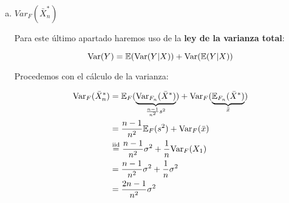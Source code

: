 \documentclass[a4paper]{article}
\begin{document}
\begin{enumerate}[a)]
	\item $Var_{F}(\bar X_n^*)$
	
	Para este último apartado haremos uso de la \textbf{ley de la varianza total}:
	
	\[
		\text{Var}(Y) = \mathbb{E}(\text{Var}(Y|X)) + \text{Var}(\mathbb{E}(Y|X))
	\]
	
	Procedemos con el cálculo de la varianza:
	
	\[
		\begin{split}
			\text{Var}_{F}(\bar X_n^*) & = \mathbb{E}_{F}( \underbrace{\text{Var}_{F_n}(\bar X^*)}_{\frac{n-1}{n^2} s^2} ) + \text{Var}_{F}( \underbrace{\mathbb{E}_{F_n}(\bar X^*)}_{\bar x} )\\
			& = \frac{n-1}{n^2} \mathbb{E}_{F}(s^2) + \text{Var}_{F}( \bar x ) \\
			& \stackrel{\text{iid}}{=} \frac{n-1}{n^2} \sigma^2 + \frac{1}{n} \text{Var}_{F}(X_1)  \\
			& = \frac{n-1}{n^2} \sigma^2 + \frac{1}{n} \sigma^2 \\
			& = \frac{2n-1}{n^2} \sigma^2 \\
		\end{split}
	\]
	
\end{enumerate}
\end{document}
